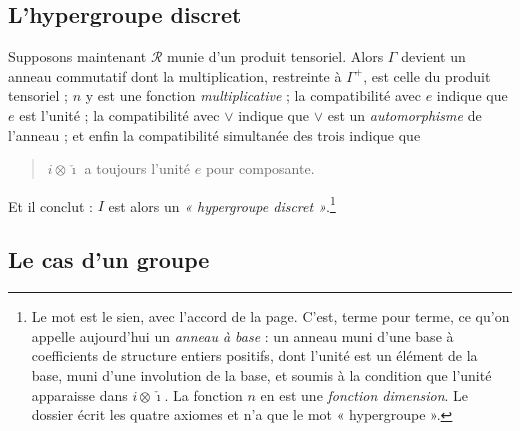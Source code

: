 \documentclass[11pt,a4paper]{article}
\begin{document}
\subsection*{L'hypergroupe discret}

Supposons maintenant $\mathcal{R}$ munie d'un produit tensoriel. Alors
$\Gamma$ devient un anneau commutatif dont la multiplication, restreinte à
$\Gamma^{+}$, est celle du produit tensoriel ; $n$ y est une fonction
\emph{multiplicative} ; la compatibilité avec $e$ indique que $e$ est l'unité ;
la compatibilité avec $\vee$ indique que $\vee$ est un \emph{automorphisme}
de l'anneau ; et enfin la compatibilité simultanée des trois indique que
\begin{quote}
$i \otimes \check{\imath}$ a toujours l'unité $e$ pour composante.
\end{quote}
Et il conclut : $I$ est alors un \emph{« hypergroupe discret »}.\footnote{Le
mot est le sien, avec l'accord de la page. C'est, terme pour terme, ce qu'on
appelle aujourd'hui un \emph{anneau à base} : un anneau muni d'une base à
coefficients de structure entiers positifs, dont l'unité est un élément de la
base, muni d'une involution de la base, et soumis à la condition que l'unité
apparaisse dans $i \otimes \check{\imath}$. La fonction $n$ en est une
\emph{fonction dimension}. Le dossier écrit les quatre axiomes et n'a que le mot
« hypergroupe ».}

\subsection*{Le cas d'un groupe}
\end{document}
